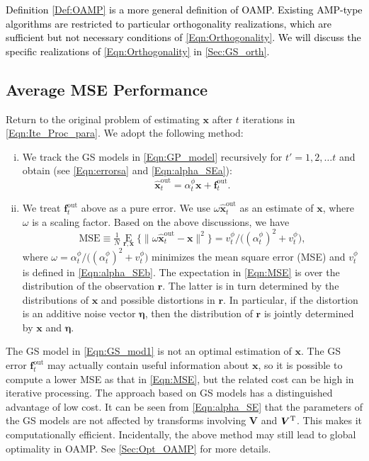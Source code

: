 \documentclass[journal]{IEEEtran}
\newcommand{\mr}{\mathrm}
\newcommand{\BE}{\begin{equation}}
\newcommand{\EE}{\end{equation}}
\renewcommand{\bf}{\bm}
\newcommand{\LL}[1]{\textcolor{black}{#1}}
\begin{document}
\LL{Definition \ref{Def:OAMP} is a more general definition of OAMP. Existing AMP-type algorithms are restricted to particular orthogonality realizations, which are sufficient but not necessary conditions of \eqref{Eqn:Orthogonality}.  We will discuss the specific  realizations of \eqref{Eqn:Orthogonality} in \ref{Sec:GS_orth}.} %


\subsection{Average MSE Performance}\label{Sec:aver_MSE}
Return to the original problem of estimating $\bf{x}$ after $t$ iterations in \eqref{Eqn:Ite_Proc_para}. We adopt the following method: 
\begin{enumerate}[(i)]
       \item	We track the GS models in \eqref{Eqn:GP_model} recursively for $t'=1, 2, \dots t$ and obtain (see \eqref{Eqn:errorsa} and \eqref{Eqn:alpha_SEa}):
       \BE\label{Eqn:GS_mod1}
         \hat{\bf{x}}_{t}^{\mr{out}} = \alpha_{t}^\phi \bf{x}+\bf{f}_{t}^{\mr{out}}.
       \EE
    \item We treat $\bf{f}_{t}^{\mr{out}}$ above as a pure error. We use $\omega\hat{\bf{x}}_{t}^{\mr{out}}$ as an estimate of $\bf{x}$, where $\omega$ is a scaling factor. Based on the above discussions, we have
    \BE\label{Eqn:MSE}
        \mr{MSE} \equiv\tfrac{1}{N}\!\mathop\mr{E}\limits_{\bf{r},\bf{x} }\big\{\|\omega \hat{\bf{x}}_{t}^{\mr{out}} - \bf{x}\|^2\big\} = v_{t}^{\phi}/\big((\alpha_{t}^{\phi})^2+v_{t}^{\phi}\big),
    \EE
   where $\omega=\alpha_{t}^{\phi}/\big((\alpha_{t}^{\phi})^2+v_{t}^{\phi}\big)$ minimizes the mean square error (MSE) and $v_{t}^{\phi}$ is defined in \eqref{Eqn:alpha_SEb}. The expectation in \eqref{Eqn:MSE} is over the distribution of the observation $\bf{r}$. The latter is in turn determined by the distributions of $\bf{x}$ and possible distortions in  $\bf{r}$. In particular, if the distortion is an additive noise vector $\bf{\eta}$, then the distribution of $\bf{r}$ is jointly determined by $\bf{x}$ and $\bf{\eta}$. 
   
\end{enumerate}

The GS model in \eqref{Eqn:GS_mod1} is not an optimal estimation of $\bf{x}$. The GS error $\bf{f}_{t}^{\mr{out}}$  may actually contain useful information about $\bf{x}$, so it is possible to compute a lower MSE as that in \eqref{Eqn:MSE}, but the related cost can be high in iterative processing. The approach based on GS models has a distinguished advantage of low cost. It can be seen from \eqref{Eqn:alpha_SE} that the parameters of the GS models are not affected by transforms involving $\bf{V}$ and $\bf{V}^{\rm T}$. This makes it computationally efficient. Incidentally, the above method may still lead to global optimality in OAMP. See \ref{Sec:Opt_OAMP} for more details.
\end{document}
